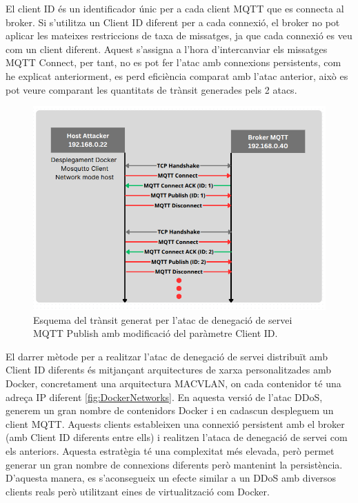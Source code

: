 El client ID és un identificador únic per a cada client MQTT que es connecta al broker. Si s'utilitza un Client ID diferent per a cada connexió, el broker no pot aplicar les mateixes restriccions de taxa de missatges, ja que cada connexió es veu com un client diferent. Aquest s'assigna a l'hora d'intercanviar els missatges MQTT Connect, per tant, no es pot fer l'atac amb connexions persistents, com he explicat anteriorment, es perd eficiència comparat amb l'atac anterior, això es pot veure comparant les quantitats de trànsit generades pels 2 atacs.

  \begin{figure}[H]
    \centering
    \includegraphics[width=1\textwidth]{img/DoSclientID.png}
    \caption{Esquema del trànsit generat per l'atac de denegació de servei MQTT Publish amb modificació del paràmetre Client ID.}
    \label{fig:DoSclientId}
  \end{figure}

El darrer mètode per a realitzar l'atac de denegació de servei distribuït amb Client ID diferents és mitjançant arquitectures de xarxa personalitzades amb Docker, concretament una arquitectura MACVLAN, on cada contenidor té una adreça IP diferent \ref{fig:DockerNetworks}. En aquesta versió de l'atac DDoS, generem un gran nombre de contenidors Docker i en cadascun despleguem un client MQTT. Aquests clients estableixen una connexió persistent amb el broker (amb Client ID diferents entre ells) i realitzen l'ataca de denegació de servei com els anteriors. Aquesta estratègia té una complexitat més elevada, però permet generar un gran nombre de connexions diferents però mantenint la persistència. D'aquesta manera, es s'aconsegueix un efecte similar a un DDoS amb diversos clients reals però utilitzant eines de virtualització com Docker.


